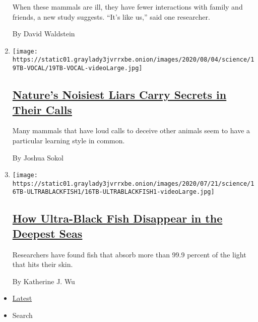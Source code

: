 \begin{enumerate}
  When these mammals are ill, they have fewer interactions with family
  and friends, a new study suggests. ``It's like us,'' said one
  researcher.

  By David Waldstein
\item
  \texttt{[image: https://static01.graylady3jvrrxbe.onion/images/2020/08/04/science/19TB-VOCAL/19TB-VOCAL-videoLarge.jpg]}

  \hypertarget{natures-noisiest-liars-carry-secrets-in-their-calls}{%
  \subsection{\texorpdfstring{\href{/2020/07/21/science/mammals-vocal-learning.html}{Nature's
  Noisiest Liars Carry Secrets in Their
  Calls}}{Nature's Noisiest Liars Carry Secrets in Their Calls}}\label{natures-noisiest-liars-carry-secrets-in-their-calls}}

  Many mammals that have loud calls to deceive other animals seem to
  have a particular learning style in common.

  By Joshua Sokol
\item
  \texttt{[image: https://static01.graylady3jvrrxbe.onion/images/2020/07/21/science/16TB-ULTRABLACKFISH1/16TB-ULTRABLACKFISH1-videoLarge.jpg]}

  \hypertarget{how-ultra-black-fish-disappear-in-the-deepest-seas}{%
  \subsection{\texorpdfstring{\href{/2020/07/16/science/ultra-black-fish.html}{How
  Ultra-Black Fish Disappear in the Deepest
  Seas}}{How Ultra-Black Fish Disappear in the Deepest Seas}}\label{how-ultra-black-fish-disappear-in-the-deepest-seas}}

  Researchers have found fish that absorb more than 99.9 percent of the
  light that hits their skin.

  By Katherine J. Wu
\end{enumerate}

\begin{itemize}
\tightlist
\item
  \protect\hyperlink{stream-panel}{Latest}
\item
  Search
\end{itemize}

